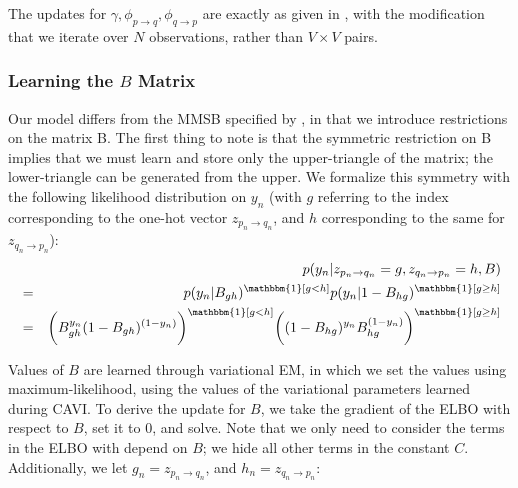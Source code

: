 The updates for $\gamma, \phi_{p \rightarrow q}, \phi_{q \rightarrow p}$ are exactly as given in \cite{airoldi:2008}, with the modification that we iterate over $N$ observations, rather than $V \times V$ pairs.

\subsubsection{Learning the $B$ Matrix}

Our model differs from the MMSB specified by \cite{airoldi:2008} , in that we introduce restrictions on the matrix B.
The first thing to note is that the symmetric restriction on B implies that we must learn and store only the upper-triangle of the matrix; the lower-triangle can be generated from the upper.
We formalize this symmetry with the following likelihood distribution on $y_n$ (with $g$ referring to the index corresponding to the one-hot vector $z_{p_n \rightarrow q_n}$, and $h$ corresponding to the same for $z_{q_n \rightarrow p_n}$):
\begin{eqnarray*}
&& p(y_n | z_{p_n \rightarrow q_n} = g, z_{q_n \rightarrow p_n} = h, B) \\
&=& p(y_n | B_{gh})^{\mathbbm{1}[g < h]}p(y_n | 1 - B_{hg})^{\mathbbm{1}[g \geq h]} \\
&=& \bigg(B_{gh}^{y_n}(1-B_{gh})^{(1-y_n)}\bigg)^{\mathbbm{1}[g < h]} \bigg((1-B_{hg})^{y_n}B_{hg}^{(1-y_n)}\bigg)^{\mathbbm{1}[g \geq h]}
\end{eqnarray*}

Values of $B$ are learned through variational EM, in which we set the values using maximum-likelihood, using the values of the variational parameters learned during CAVI.
To derive the update for $B$, we take the gradient of the ELBO with respect to $B$, set it to $0$, and solve.
Note that we only need to consider the terms in the ELBO with depend on $B$; we hide all other terms in the constant $C$.
Additionally, we let $g_n = z_{p_n \rightarrow q_n}$, and $h_n = z_{q_n \rightarrow p_n}$:

